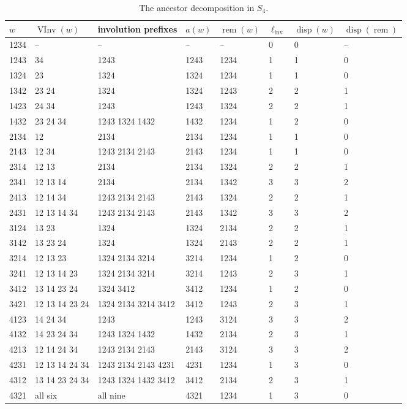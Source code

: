\documentclass[11pt]{amsart}
\theoremstyle{definition}
\theoremstyle{remark}
\numberwithin{equation}{section}
\newcommand{\linv}{\ell_{\mathrm{inv}}}
\DeclareMathOperator{\rem}{rem}
\DeclareMathOperator{\disp}{disp}
\DeclareMathOperator{\VInv}{VInv}
\begin{document}
\begin{table}[ht]
\centering
\small
\caption{The ancestor decomposition in \(S_4\).}\label{tab:S4}
\begin{tabular}{llllllll}
\toprule
\(w\) & \(\VInv(w)\) & involution prefixes & \(a(w)\) & \(\rem(w)\) & \(\linv\) & \(\disp(w)\) & \(\disp(\rem)\)\\
\midrule
1234 & -- & -- & -- & -- & 0 & 0 & --\\
1243 & 34 & 1243 & 1243 & 1234 & 1 & 1 & 0\\
1324 & 23 & 1324 & 1324 & 1234 & 1 & 1 & 0\\
1342 & 23 24 & 1324 & 1324 & 1243 & 2 & 2 & 1\\
1423 & 24 34 & 1243 & 1243 & 1324 & 2 & 2 & 1\\
1432 & 23 24 34 & 1243 1324 1432 & 1432 & 1234 & 1 & 2 & 0\\
2134 & 12 & 2134 & 2134 & 1234 & 1 & 1 & 0\\
2143 & 12 34 & 1243 2134 2143 & 2143 & 1234 & 1 & 1 & 0\\
2314 & 12 13 & 2134 & 2134 & 1324 & 2 & 2 & 1\\
2341 & 12 13 14 & 2134 & 2134 & 1342 & 3 & 3 & 2\\
2413 & 12 14 34 & 1243 2134 2143 & 2143 & 1324 & 2 & 2 & 1\\
2431 & 12 13 14 34 & 1243 2134 2143 & 2143 & 1342 & 3 & 3 & 2\\
3124 & 13 23 & 1324 & 1324 & 2134 & 2 & 2 & 1\\
3142 & 13 23 24 & 1324 & 1324 & 2143 & 2 & 2 & 1\\
3214 & 12 13 23 & 1324 2134 3214 & 3214 & 1234 & 1 & 2 & 0\\
3241 & 12 13 14 23 & 1324 2134 3214 & 3214 & 1243 & 2 & 3 & 1\\
3412 & 13 14 23 24 & 1324 3412 & 3412 & 1234 & 1 & 2 & 0\\
3421 & 12 13 14 23 24 & 1324 2134 3214 3412 & 3412 & 1243 & 2 & 3 & 1\\
4123 & 14 24 34 & 1243 & 1243 & 3124 & 3 & 3 & 2\\
4132 & 14 23 24 34 & 1243 1324 1432 & 1432 & 2134 & 2 & 3 & 1\\
4213 & 12 14 24 34 & 1243 2134 2143 & 2143 & 3124 & 3 & 3 & 2\\
4231 & 12 13 14 24 34 & 1243 2134 2143 4231 & 4231 & 1234 & 1 & 3 & 0\\
4312 & 13 14 23 24 34 & 1243 1324 1432 3412 & 3412 & 2134 & 2 & 3 & 1\\
4321 & all six & all nine & 4321 & 1234 & 1 & 3 & 0\\
\bottomrule
\end{tabular}
\end{table}
\end{document}
